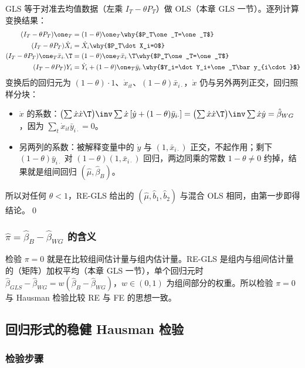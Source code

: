GLS 等于对准去均值数据（左乘 $I_T-\theta P_T$）做 OLS（本章 GLS 一节）。逐列计算变换结果：
\begin{align*}
(I_T-\theta P_T)\one_T &= (1-\theta)\one_T \why{$P_T\one_T=\one_T$}\\
(I_T-\theta P_T)\dot X_i &= \dot X_i \why{$P_T\dot X_i=0$}\\
(I_T-\theta P_T)\one_T\bar x_{i\cdot}\T &= (1-\theta)\one_T\bar x_{i\cdot}\T \why{$P_T\one_T=\one_T$}\\
(I_T-\theta P_T)Y_i &= \dot Y_i+(1-\theta)\one_T\bar y_{i\cdot} \why{$Y_i=\dot Y_i+\one_T\bar y_{i\cdot}$}
\end{align*}
变换后的回归元为 $(1-\theta)\cdot1$、$\dot x_{it}$、$(1-\theta)\bar x_{i\cdot}$，$\dot x$ 仍与另外两列正交，回归照样分块：
\begin{itemize}
  \item $\dot x$ 的系数：$\bigl(\sum\dot x\dot x\T\bigr)\inv\sum\dot x\,[\dot y+(1-\theta)\bar y_{i\cdot}]=\bigl(\sum\dot x\dot x\T\bigr)\inv\sum\dot x\dot y=\hat\beta_{WG}$，因为 $\sum_t\dot x_{it}\bar y_{i\cdot}=0$。
  \item 另两列的系数：被解释变量中的 $\dot y$ 与 $(1,\bar x_{i\cdot})$ 正交，不起作用；剩下 $(1-\theta)\bar y_{i\cdot}$ 对 $(1-\theta)(1,\bar x_{i\cdot})$ 回归，两边同乘的常数 $1-\theta\neq0$ 约掉，结果就是组间回归 $(\hat\mu,\hat\beta_B)$。
\end{itemize}
所以对任何 $\theta<1$，RE-GLS 给出的 $(\hat\mu,\hat b_1,\hat b_2)$ 与混合 OLS 相同，由第一步即得结论。\qed

\subsubsection{\texorpdfstring{$\hat\pi=\hat\beta_B-\hat\beta_{WG}$}{pi-hat = beta\_B - beta\_WG} 的含义}

检验 $\pi=0$ 就是在比较组间估计量与组内估计量。RE-GLS 是组内与组间估计量的（矩阵）加权平均（本章 GLS 一节），单个回归元时 $\hat\beta_{GLS}-\hat\beta_{WG}=w(\hat\beta_B-\hat\beta_{WG})$，$w\in(0,1)$ 为组间部分的权重。所以检验 $\pi=0$ 与 Hausman 检验比较 RE 与 FE 的思想一致。

\subsection{回归形式的稳健 Hausman 检验}

\subsubsection{检验步骤}

